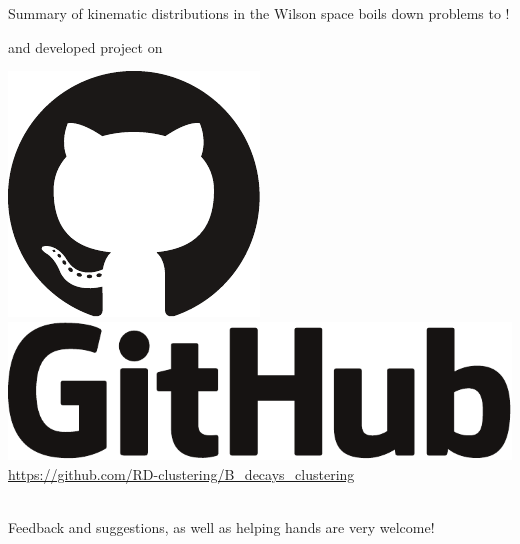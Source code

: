 \begin{frame}{Summary}
%	
%	
%	
	 of kinematic distributions in the Wilson space boils down  problems to !
	
	\bigskip
	 and  developed project on\\[2ex]
	\begin{minipage}{\linewidth}
		\includegraphics[height=2.5ex]{figures/software_logos/octocat.pdf}\hspace{0.3em}
		\includegraphics[height=2.5ex]{figures/software_logos/github.pdf}\\
		{\color{purple}\url{https://github.com/RD-clustering/B_decays_clustering}}
	\end{minipage}\\[2ex]
	Feedback and suggestions, as well as helping hands are very welcome!
\end{frame}